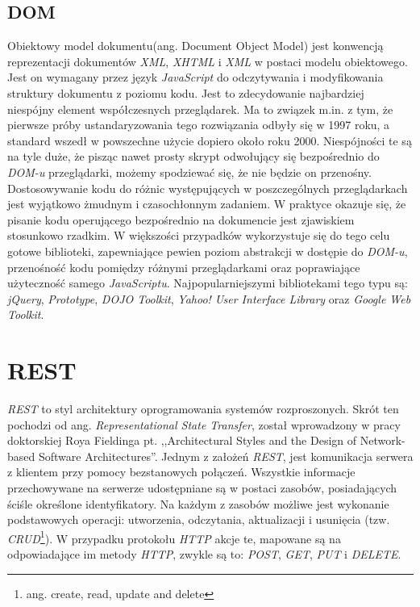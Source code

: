 \documentclass[11pt,twoside]{report}
\begin{document}
\subsection{DOM}
Obiektowy model dokumentu(ang. Document Object Model) jest konwencją
reprezentacji dokumentów \emph{XML}, \emph{XHTML} i \emph{XML} w
postaci modelu obiektowego. Jest on wymagany przez język
\emph{JavaScript} do odczytywania i modyfikowania struktury dokumentu
z poziomu kodu. Jest to zdecydowanie najbardziej niespójny element
współczesnych przeglądarek. Ma to związek m.in. z tym, że pierwsze
próby ustandaryzowania tego rozwiązania odbyły się w 1997 roku, a
standard wszedł w powszechne użycie dopiero około roku
2000. Niespójności te są na tyle duże, że pisząc nawet prosty skrypt
odwołujący się bezpośrednio do \emph{DOM-u} przeglądarki, możemy
spodziewać się, że nie będzie on przenośny. Dostosowywanie kodu do
różnic występujących w poszczególnych przeglądarkach jest wyjątkowo
żmudnym i czasochłonnym zadaniem. W praktyce okazuje się, że pisanie
kodu operującego bezpośrednio na dokumencie jest zjawiskiem stosunkowo
rzadkim. W większości przypadków wykorzystuje się do tego celu gotowe
biblioteki, zapewniające pewien poziom abstrakcji w dostępie do
\emph{DOM-u}, przenośność kodu pomiędzy różnymi przeglądarkami oraz
poprawiające użyteczność samego
\emph{JavaScriptu}. Najpopularniejszymi bibliotekami tego typu są:
\emph{jQuery}, \emph{Prototype}, \emph{DOJO Toolkit}, \emph{Yahoo!
  User Interface Library} oraz \emph{Google Web Toolkit}.

\section{REST}
\emph{REST} to styl architektury oprogramowania systemów
rozproszonych. Skrót ten pochodzi od ang. \emph{Representational State
  Transfer}, został wprowadzony w pracy doktorskiej Roya Fieldinga
pt. ,,Architectural Styles and the Design of Network-based Software
Architectures''\cite{rest}. Jednym z założeń \emph{REST}, jest
komunikacja serwera z klientem przy pomocy bezstanowych
połączeń. Wszystkie informacje przechowywane na serwerze udostępniane
są w postaci zasobów, posiadających ściśle określone
identyfikatory. Na każdym z zasobów możliwe jest wykonanie
podstawowych operacji: utworzenia, odczytania, aktualizacji i
usunięcia (tzw. \emph{CRUD}\footnote{ang. create, read, update and
  delete}). W przypadku protokołu \emph{HTTP} akcje te, mapowane są na
odpowiadające im metody \emph{HTTP}, zwykle są to: \emph{POST},
\emph{GET}, \emph{PUT} i \emph{DELETE}\cite{agile}.
\end{document}
